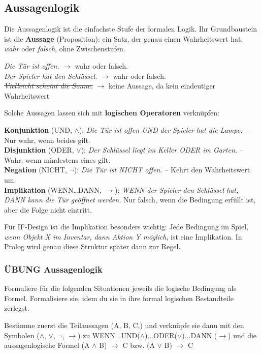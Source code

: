 \documentclass[parskip=half,a4paper,11pt]{scrreprt}
\begin{document}
\subsection{Aussagenlogik}

Die Aussagenlogik ist die einfachste Stufe der formalen Logik. Ihr Grundbaustein ist die \textbf{Aussage} (Proposition): ein Satz, der genau einen Wahrheitswert hat, \textit{wahr} oder \textit{falsch}, ohne Zwischenstufen.

\textit{Die Tür ist offen.} $\rightarrow$ wahr oder falsch.\\
\textit{Der Spieler hat den Schlüssel.} $\rightarrow$ wahr oder falsch.\\
\textit{\sout{Vielleicht scheint die Sonne.}} $\rightarrow$ keine Aussage, da kein eindeutiger Wahrheitswert

Solche Aussagen lassen sich mit \textbf{logischen Operatoren} verknüpfen:

\textbf{Konjunktion} (UND, $\land$): \textit{Die Tür ist offen UND der Spieler hat die Lampe.} – Nur wahr, wenn beides gilt.\\
\textbf{Disjunktion} (ODER, $\lor$): \textit{Der Schlüssel liegt im Keller ODER im Garten.} – Wahr, wenn mindestens eines gilt.\\
\textbf{Negation} (NICHT, $\neg$): \textit{Die Tür ist NICHT offen.} – Kehrt den Wahrheitswert um.\\
\textbf{Implikation} (WENN\dots DANN, $\rightarrow$): \textit{WENN der Spieler den Schlüssel hat, DANN kann die Tür geöffnet werden.} Nur falsch, wenn die Bedingung erfüllt ist, aber die Folge nicht eintritt.

Für IF-Design ist die Implikation besonders wichtig: Jede Bedingung im Spiel, \textit{wenn Objekt X im Inventar, dann Aktion Y möglich}, ist eine Implikation. In Prolog wird genau diese Struktur später dann zur Regel.

\subsubsection{ÜBUNG Aussagenlogik}
Formuliere für die folgenden Situationen jeweils die logische Bedingung als Formel. Formalisiere sie, idem du sie in ihre formal logischen Bestandteile zerlegst.

Bestimme zuerst die Teilaussagen (A, B, C,) und verknüpfe sie dann mit den Symbolen ($\land$, $\lor$, $\neg$, $\rightarrow$)  zu  WENN...UND($\land$)...ODER($\lor$)...DANN ($\rightarrow$) und die aussagenlogische Formel (A $\land$ B) $\rightarrow$ C bzw. (A $\lor$ B) $\rightarrow$ C\\
\end{document}
